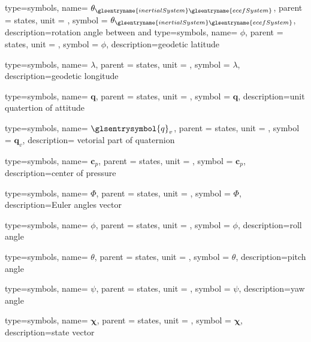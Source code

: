 {type=symbols,
	name= \ensuremath{\theta_{\glsentryname{inertialSystem}\glsentryname{ecefSystem}}},
	parent = {states},
	unit = \unexpanded{\si{\radian\per\second}},
	symbol = \ensuremath{\theta_{\glsentryname{inertialSystem}\glsentryname{ecefSystem}}},
	description={rotation angle between  and }
}
{type=symbols,
	name= \ensuremath{\phi},
	parent = {states},
	unit = \unexpanded{\si{\radian}},
	symbol = \ensuremath{\phi},
	description={geodetic latitude}
}

{type=symbols,
	name= \ensuremath{\lambda},
	parent = {states},
	unit = \unexpanded{\si{\radian}},
	symbol = \ensuremath{\lambda},
	description={geodetic longitude}
}


{type=symbols,
	name= \ensuremath{\mathbf{q}},
	parent = {states},
	unit = \unexpanded{},
	symbol = \ensuremath{\mathbf{q}},
	description={unit quatertion of attitude}
}

{type=symbols,
	name= \ensuremath{\glsentrysymbol{q}_v},
	parent = {states},
	unit = {},
	symbol = \ensuremath{\mathbf{q}_v},
	description={ vetorial part of quaternion }
}

{type=symbols,
	name= \ensuremath{\mathbf{c}_p},
	parent = {states},
	unit = \unexpanded{\si{\meter}},
	symbol = \ensuremath{\mathbf{c}_p},
	description={center of pressure}
}

{type=symbols,
	name= \ensuremath{\boldsymbol{\varPhi}},
	parent = {states},
	unit = \unexpanded{\si{\radian\per\second}},
	symbol = \ensuremath{\boldsymbol{\varPhi}},
	description={Euler angles vector}
}

{type=symbols,
	name= \ensuremath{\phi},
	parent = {states},
	unit = \unexpanded{\si{\radian}},
	symbol = \ensuremath{\phi},
	description={roll angle}
}

{type=symbols,
	name= \ensuremath{\theta},
	parent = {states},
	unit = \unexpanded{\si{\radian}},
	symbol = \ensuremath{\theta},
	description={pitch angle}
}

{type=symbols,
	name= \ensuremath{\psi},
	parent = {states},
	unit = \unexpanded{\si{\radian}},
	symbol = \ensuremath{\psi},
	description={yaw angle}
}

{type=symbols,
	name= \ensuremath{\boldsymbol{\chi}},
	parent = {states},
	unit = \unexpanded{},
	symbol = \ensuremath{\boldsymbol{\chi}},
	description={state vector}
}